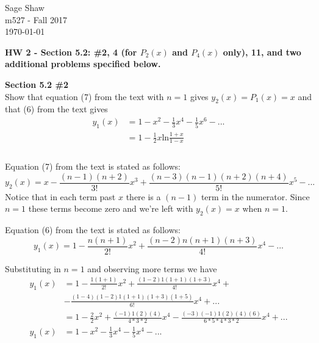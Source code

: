 \documentclass[12pt]{article}
\newcommand{\problem}[1]{\hspace{-4 ex} \large \textbf{#1}\\}
\begin{document}
	\thispagestyle{empty}
	
	\begin{flushright}
		Sage Shaw \\
		m527 - Fall 2017 \\
		\today
	\end{flushright}
	
{\large \textbf{HW 2 - Section 5.2: \#2, 4 (for $P_2(x)$ and $P_4(x)$ only), 11, and two additional problems specified below.}}\bigbreak

\problem{Section 5.2 \#2} Show that equation (7) from the text with $n=1$ gives $y_2(x)=P_1(x)=x$ and that (6) from the text gives 
\begin{align*}
y_1(x) & = 1 - x^2 - \frac{1}{3}x^4 - \frac{1}{5}x^6 - ... \\
& = 1 - \frac{1}{2}x \text{ln}\frac{1+x}{1-x} \\
\end{align*}
\\

	Equation (7) from the text is stated as follows:
	$$
	y_2(x) = x - \frac{(n-1)(n+2)}{3!}x^3 + \frac{(n-3)(n-1)(n+2)(n+4)}{5!}x^5 - ...
	$$
	Notice that in each term past $x$ there is a $(n-1)$ term in the numerator. Since $n=1$ these terms become zero and we're left with $y_2(x)=x$ when $n=1$.
	
	Equation (6) from the text is stated as follows:
	$$
	y_1(x) = 1 - \frac{n(n+1)}{2!}x^2 + \frac{(n-2)n(n+1)(n+3)}{4!}x^4 - ...
	$$
	
	Substituting in $n=1$ and observing more terms we have
	\begin{align}
		y_1(x) & = 1 - \frac{1(1+1)}{2!}x^2 + \frac{(1-2)1(1+1)(1+3)}{4!}x^4 + \nonumber \\
		& - \frac{(1-4)(1-2)1(1+1)(1+3)(1+5)}{6!}x^4 +... \nonumber \\
		& = 1 - \frac{2}{2}x^2 + \frac{(-1)1(2)(4)}{4*3*2}x^4 - \frac{(-3)(-1)1(2)(4)(6)}{6*5*4*3*2}x^4 +... \nonumber \\
		y_1(x) & = 1 - x^2 - \frac{1}{3}x^4 - \frac{1}{5}x^4 -... \label{p1_e1}
	\end{align}
	
\end{document}
